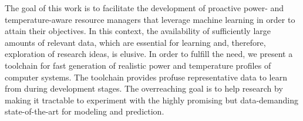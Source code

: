 The goal of this work is to facilitate the development of proactive
\mbox{power-} and temperature-aware resource managers that leverage machine
learning in order to attain their objectives. In this context, the availability
of sufficiently large amounts of relevant data, which are essential for learning
and, therefore, exploration of research ideas, is elusive. In order to fulfill
the need, we present a toolchain for fast generation of realistic power and
temperature profiles of computer systems. The toolchain provides profuse
representative data to learn from during development stages. The overreaching
goal is to help research by making it tractable to experiment with the highly
promising but data-demanding state-of-the-art for modeling and prediction.
